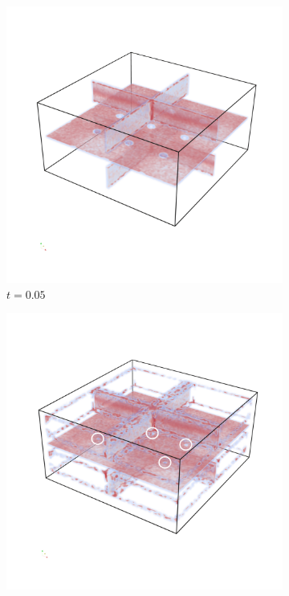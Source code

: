 \begin{figure}[]
    \centering
    \begin{subfigure}[]{0.7\textwidth}
        \includegraphics[trim=0 350 0 300, clip=true, width=\textwidth]{Images/MCridge.png}
        \caption{$t=0.05$}
        \label{fig:MCridge}
    \end{subfigure}
    \begin{subfigure}[]{0.49\textwidth}
        \includegraphics[trim=0 350 0 300, clip=true, width=\textwidth]{Images/MCridgetol.png}

\end{subfigure}
\end{figure}
